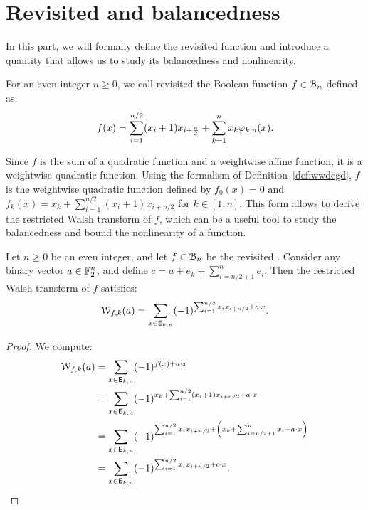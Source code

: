\documentclass[11pt]{llncs}
\begin{document}
\section{Revisited \hwbf{} and balancedness}\label{sec:defAndBal}

In this part, we will formally define the revisited \hwbf{} function and introduce a quantity that allows us to study its balancedness and nonlinearity.

\begin{definition}\label{def:revHWBF}
For an even integer $n\geq 0$, we call revisited \hwbf{} the Boolean function $f\in\mathcal{B}_n$ defined as:
\[f(x)=\sum_{i=1}^{n/2}(x_i+1) x_{i+\frac{n}{2}} + \sum_{k=1}^nx_k\varphi_{k,n}(x).\]
\end{definition}


Since $f$ is the sum of a quadratic function and a weightwise affine function, it is a weightwise quadratic function. Using the formalism of Definition~\ref{def:wwdegd}, $f$ is the weightwise quadratic function defined by $f_0(x)=0$ and $f_k(x)=x_k+\sum_{i=1}^{n/2}(x_i+1) x_{i+n/2}$ for $k\in[1,n]$. This form allows to derive the restricted Walsh transform of $f$, which can be a useful tool to study the balancedness and bound the nonlinearity of a function.
\begin{proposition}\label{prop:restrWT}
Let $n\geq 0$ be an even integer, and let $f\in\mathcal{B}_n$ be the revisited \hwbf{}. Consider any binary vector $a\in\mathbb{F}_2^n$, and define $c=a+e_k+\sum_{i=n/2+1}^n e_i$. Then the restricted Walsh transform of $f$ satisfies:
\[\mathcal{W}_{f,k}(a)=\sum_{x \in \mathsf{E}_{k,n}} (-1)^{\sum_{i=1}^{n/2} x_i x_{i+n/2}+ c \cdot x}.\]
\end{proposition}
\begin{proof}
We compute:
\begin{align*}
    \mathcal{W}_{f,k}(a)&=\sum_{x \in \mathsf{E}_{k,n}} (-1)^{f(x)+a \cdot x}\\
	&=\sum_{x \in \mathsf{E}_{k,n}} (-1)^{x_k + \sum_{i=1}^{n/2} (x_i+1) x_{i+n/2}+ a \cdot x}\\
	&=\sum_{x \in \mathsf{E}_{k,n}} (-1)^{\sum_{i=1}^{n/2} x_i x_{i+n/2}+\left(x_k+\sum_{i=n/2+1}^{n}x_i+a\cdot x\right)}\\
    &=\sum_{x \in \mathsf{E}_{k,n}} (-1)^{\sum_{i=1}^{n/2} x_i x_{i+n/2}+ c \cdot x}.\qedhere
\end{align*}
\end{proof}
\end{document}
